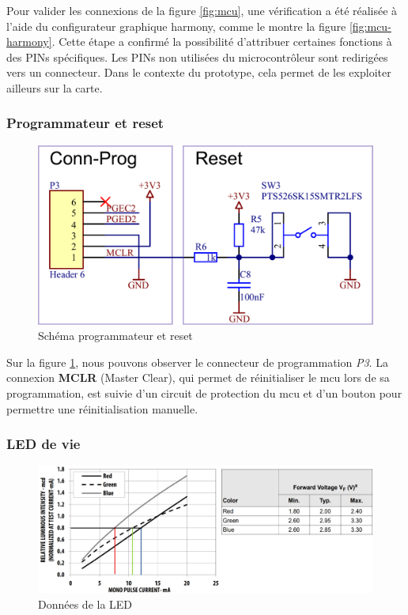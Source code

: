 Pour valider les connexions de la figure \ref{fig:mcu}, une vérification a été réalisée à l'aide du configurateur graphique \gls{harmony}, comme le montre la figure \ref{fig:mcu-harmony}. Cette étape a confirmé la possibilité d'attribuer certaines fonctions à des PINs spécifiques. Les PINs non utilisées du microcontrôleur sont redirigées vers un connecteur. Dans le contexte du prototype, cela permet de les exploiter ailleurs sur la carte.


\subsubsection{Programmateur et reset} 

\begin{figure}[h]
	\centering
	\includegraphics[width=.9\linewidth]{../figures/etude/sch/Prog-Reset}
	\caption{Schéma programmateur et reset}
	\label{fig:prog-reset}
\end{figure}

Sur la figure \ref{fig:prog-reset}, nous pouvons observer le connecteur de programmation \textit{P3}. La connexion \textbf{MCLR} (Master Clear), qui permet de réinitialiser le \gls{mcu} lors de sa programmation, est suivie d'un circuit de protection du \gls{mcu} et d'un bouton pour permettre une réinitialisation manuelle.

\clearpage

\subsubsection{LED de vie} 

\begin{figure}[h]
	\centering
	\includegraphics[width=.9\linewidth]{../figures/etude/DIM-LED}
	\caption{Données de la LED}
	\label{fig:dim-led}
\end{figure}

